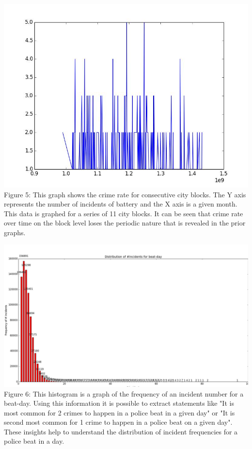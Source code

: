 \documentclass[journal]{IEEEtran}
\begin{document}
\includegraphics[scale = 0.3]{unknown.jpg}
Figure 5:
This graph shows the crime rate for consecutive city blocks. The Y axis represents the number of incidents of battery and the X axis is a given month. This data is graphed for a series of 11 city blocks. It can be seen that crime rate over time on the block level loses the periodic nature that is revealed in the prior graphs.


\includegraphics[scale = 0.14]{incidents.jpg}
Figure 6:
This histogram is a graph of the frequency of an incident number for a beat-day. 
Using this information it is possible to extract statements like "It is most common for 2 crimes to happen in a police beat in a given day" or "It is second most common for 1 crime to happen in a police beat on a given day". These insights help to understand the distribution of incident frequencies for a police beat in a day. 
\end{document}
